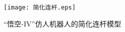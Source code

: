 \begin{figure}[htbp]
    \centering
    \texttt{[image: 简化连杆.eps]}
    \caption{\label{fig:link_model}“悟空-IV”仿人机器人的简化连杆模型}
\end{figure}


